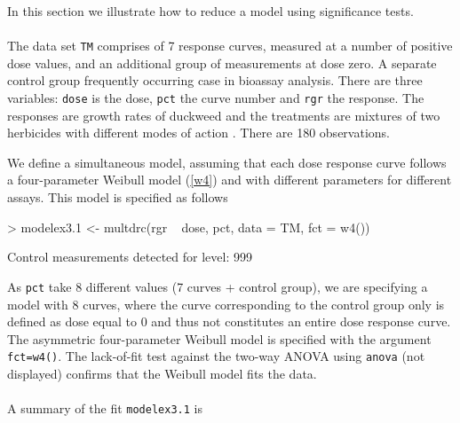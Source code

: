 \documentclass[a4paper]{article}
\begin{document}
In this section we illustrate how to reduce a model using significance tests.
\\
\\
The data set \verb+TM+ comprises of 7 response curves, measured at a number of positive dose values, and an additional group of measurements at dose zero.
A separate control group frequently occurring case in bioassay analysis.
There are three variables: \verb+dose+ is the dose, \verb+pct+ the curve number and \verb+rgr+ the response.
The responses are growth rates of duckweed and the treatments are mixtures of two herbicides with different modes of action \citep{cedergreen:2004}. 
There are 180 observations.

We define a simultaneous model, assuming that each dose response curve follows a four-parameter Weibull model (\ref{w4})
and with different parameters for different assays. This model is specified as follows

\begin{Schunk}
\begin{Sinput}
> modelex3.1 <- multdrc(rgr ~ dose, pct, data = TM, fct = w4())
\end{Sinput}
\begin{Soutput}
Control measurements detected for level: 999
\end{Soutput}
\end{Schunk}
As \verb+pct+ take 8 different values (7 curves + control group), we are specifying a model with 8 curves, where the curve corresponding to the control
group only is defined as dose equal to 0 and thus not constitutes an entire dose response curve.
The asymmetric four-parameter Weibull model is specified with the argument \verb+fct=w4()+. 
The lack-of-fit test against the two-way ANOVA using \verb+anova+ (not displayed) confirms that the Weibull model fits the data.
\\
\\
A summary of the fit \verb+modelex3.1+ is
\end{document}
